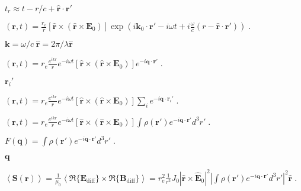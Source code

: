 \documentclass[12pt]{article}
\renewcommand{\vec}[1]{\boldsymbol{#1}}%
\def\lthtmlcheckvsize{\ifdim\ht\sizebox<\vsize 
  \ifdim\wd\sizebox<\hsize\expandafter\hfill\fi \expandafter\vfill
  \else\expandafter\vss\fi}%
\begin{document}
{\newpage\clearpage
{}%
$ t_r \approx t - r/c + \hat{\vec{r}} \cdot \vec r'$%
\lthtmlindisplaymathZ
\lthtmlcheckvsize\clearpage}

{\newpage\clearpage
{}%
$\displaystyle (\vec{r},t) =  \frac{r_e}{r} [\hat{\vec{r}} \times ( \hat{\vec{r}} \times  \vec{E}_0 )]\exp\left(i\vec{k}_0 \cdot \vec{r}' - i\omega t + i \frac{\omega}{c}( r  - \hat{\vec{r}}\cdot \vec{r}')\right) \;.$%
\lthtmlindisplaymathZ
\lthtmlcheckvsize\clearpage}

{\newpage\clearpage
{}%
$ \vec{k} = \omega/c\; \hat{\vec{r}}=2\pi/\lambda \hat{\vec{r}}$%
\lthtmlindisplaymathZ
\lthtmlcheckvsize\clearpage}

{\newpage\clearpage
{}%
$\displaystyle (\vec{r},t) =  r_e\frac{e^{ikr}}{r} e^{-i\omega t}[\hat{\vec{r}} \times ( \hat{\vec{r}} \times  \vec{E}_0 )]e^{-i\vec{q}\cdot\vec{r}'} \;.$%
\lthtmlindisplaymathZ
\lthtmlcheckvsize\clearpage}

{\newpage\clearpage
{}%
$ \vec{r}_i'$%
\lthtmlindisplaymathZ
\lthtmlcheckvsize\clearpage}

{\newpage\clearpage
{}%
$\displaystyle (\vec{r},t) =  r_e\frac{e^{ikr}}{r} e^{-i\omega t}[\hat{\vec{r}} \times ( \hat{\vec{r}} \times  \vec{E}_0 )] \sum_i e^{-i\vec{q}\cdot\vec{r}_i'} \;.$%
\lthtmlindisplaymathZ
\lthtmlcheckvsize\clearpage}

{\newpage\clearpage
{}%
$\displaystyle (\vec{r},t) =  r_e\frac{e^{ikr}}{r} e^{-i\omega t}[\hat{\vec{r}} \times ( \hat{\vec{r}} \times  \vec{E}_0 )] \int \rho(\vec{r}') e^{-i\vec{q}\cdot\vec{r}'} d^3r' \;.$%
\lthtmlindisplaymathZ
\lthtmlcheckvsize\clearpage}

{\newpage\clearpage
{}%
$\displaystyle F(\vec{q}) = \int \rho(\vec{r}') e^{-i\vec{q}\cdot\vec{r}'} d^3r' \;.$%
\lthtmlindisplaymathZ
\lthtmlcheckvsize\clearpage}

{\newpage\clearpage
{}%
$ \vec{q}$%
\lthtmlindisplaymathZ
\lthtmlcheckvsize\clearpage}

{\newpage\clearpage
{}%
$\displaystyle \left\langle \vec{S}(\vec{r}) \right\rangle  = \frac{1}{\mu_0}\left\langle
\Re\{\vec{E}_\text{diff}\}\times\Re\{\vec{B}_\text{diff}\} \right\rangle  = r_e^2
\frac{1}{r^2} J_0 | \hat{\vec{r}} \times  \hat{\vec{E}}_0 |^2 \left| \int \rho(\vec{r}')
e^{-i\vec{q}\cdot\vec{r}'} d^3r' \right|^2 \hat{\vec{r}} \;.$%
\lthtmlindisplaymathZ
\lthtmlcheckvsize\clearpage}
\end{document}
